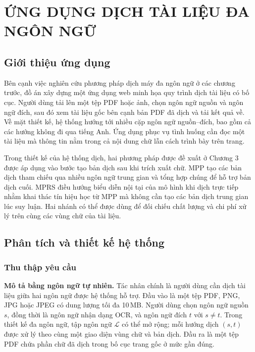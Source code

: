 \section{ỨNG DỤNG DỊCH TÀI LIỆU ĐA NGÔN NGỮ}
\label{sec:ung-dung-dich-da-ngon-ngu}

\subsection{Giới thiệu ứng dụng}

Bên cạnh việc nghiên cứu phương pháp dịch máy đa ngôn ngữ ở các chương trước, đồ án xây dựng một ứng dụng web minh họa quy trình dịch tài liệu có bố cục. Người dùng tải lên một tệp PDF hoặc ảnh, chọn ngôn ngữ nguồn và ngôn ngữ đích, sau đó xem tài liệu gốc bên cạnh bản PDF đã dịch và tải kết quả về. Về mặt thiết kế, hệ thống hướng tới nhiều cặp ngôn ngữ nguồn--đích, bao gồm cả các hướng không đi qua tiếng Anh. Ứng dụng phục vụ tình huống cần đọc một tài liệu mà thông tin nằm trong cả nội dung chữ lẫn cách trình bày trên trang.

Trong thiết kế của hệ thống dịch, hai phương pháp được đề xuất ở Chương 3 được áp dụng vào bước tạo bản dịch sau khi trích xuất chữ. MPP tạo các bản dịch tham chiếu qua nhiều ngôn ngữ trung gian và tổng hợp chúng để hỗ trợ bản dịch cuối. MPRS điều hướng biểu diễn nội tại của mô hình khi dịch trực tiếp nhằm khai thác tín hiệu học từ MPP mà không cần tạo các bản dịch trung gian lúc suy luận. Hai nhánh có thể được dùng để đối chiếu chất lượng và chi phí xử lý trên cùng các vùng chữ của tài liệu.

\subsection{Phân tích và thiết kế hệ thống}

\subsubsection{Thu thập yêu cầu}

\textbf{Mô tả bằng ngôn ngữ tự nhiên.} Tác nhân chính là người dùng cần dịch tài liệu giữa hai ngôn ngữ được hệ thống hỗ trợ. Đầu vào là một tệp PDF, PNG, JPG hoặc JPEG có dung lượng tối đa 10\,MB. Người dùng chọn ngôn ngữ nguồn $s$, đồng thời là ngôn ngữ nhận dạng OCR, và ngôn ngữ đích $t$ với $s\ne t$. Trong thiết kế đa ngôn ngữ, tập ngôn ngữ $\mathcal{L}$ có thể mở rộng; mỗi hướng dịch $(s,t)$ được xử lý theo cùng một giao diện vùng chữ và bản dịch. Đầu ra là một tệp PDF chứa phần chữ đã dịch trong bố cục trang gốc ở mức gần đúng.

